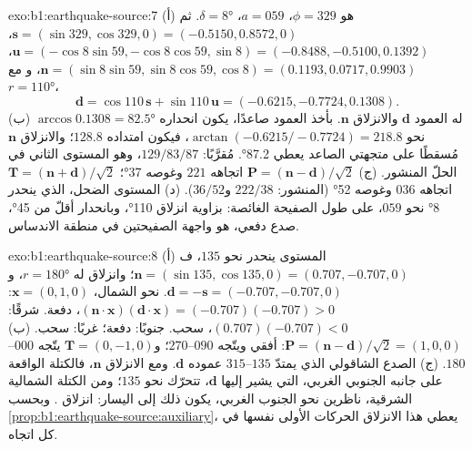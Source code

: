 \begin{solution}{exo:b1:earthquake-source:7}
(أ)  هو $\phi = 329$،  $a = 059$،  $\delta =
\ang{8}$. ثم $\mathbf s = (\sin329, \cos329, 0) = (-0.5150, 0.8572, 0)$،
$\mathbf u = (-\cos8\sin59, -\cos8\cos59, \sin8) = (-0.8488, -0.5100, 0.1392)$،
$\mathbf n = (\sin8\sin59, \sin8\cos59, \cos8) = (0.1193, 0.0717, 0.9903)$،
و مع $r = \ang{110}$،
\[
  \mathbf d = \cos110\,\mathbf s + \sin110\,\mathbf u = (-0.6215, -0.7724, 0.1308) .
\]
(ب)  له العمود $\mathbf d$ والانزلاق $\mathbf n$.
بأخذ العمود صاعدًا، يكون انحداره $\arccos 0.1308 = \ang{82.5}$ نحو
$\arctan(-0.6215/-0.7724) = 218.8$، فيكون امتداده $128.8$؛ والانزلاق
$\mathbf n$ مُسقطًا على متجهتي   الصاعد يعطي 
\ang{87.2}. مُقرَّبًا: $129/83/87$، وهو المستوى الثاني في الحلّ المنشور.
(ج) $\mathbf P = (\mathbf n - \mathbf d)/\sqrt2$ اتجاهه $221$ وغوصه
\ang{37}؛ $\mathbf T = (\mathbf n + \mathbf d)/\sqrt2$ اتجاهه $036$ وغوصه
\ang{52} (المنشور: $222/38$ و$36/52$). (د) المستوى الضحل، الذي ينحدر
\ang{8} نحو $059$، على طول الصفيحة الغائصة:  بزاوية انزلاق
\ang{110}، وبانحدار أقلّ من \ang{45}، صدع دفعي، هو واجهة الصفيحتين في منطقة الاندساس.
\end{solution}

\begin{solution}{exo:b1:earthquake-source:8}
(أ) المستوى ينحدر نحو $135$، ف$\mathbf n = (\sin135, \cos135, 0) =
(0.707, -0.707, 0)$؛ وانزلاق  له $r = \ang{180}$، و$\mathbf d = -\mathbf s
= (-0.707, -0.707, 0)$. نحو الشمال، $\mathbf x = (0, 1, 0)$:
$(\mathbf n\cdot\mathbf x)(\mathbf d\cdot\mathbf x) = (-0.707)(-0.707) > 0$، دفعة.
شرقًا: $(0.707)(-0.707) < 0$، سحب. جنوبًا: دفعة؛ غربًا: سحب.
(ب) $\mathbf P = (\mathbf n - \mathbf d)/\sqrt2 = (1, 0, 0)$:  أفقي
ويتّجه $090$--$270$؛ و$\mathbf T = (0, -1, 0)$ يتّجه
$000$--$180$. (ج) الصدع الشاقولي الذي يمتدّ $135$--$315$ عموده $\mathbf d$. ومع الانزلاق $\mathbf n$، فالكتلة الواقعة على جانبه الجنوبي الغربي، التي يشير إليها $\mathbf d$، تتحرّك نحو $135$؛ ومن الكتلة الشمالية الشرقية، ناظرين نحو الجنوب الغربي، يكون ذلك إلى اليسار: انزلاق . وبحسب
\cref{prop:b1:earthquake-source:auxiliary}، يعطي هذا الانزلاق الحركات الأولى نفسها في كل اتجاه.
\end{solution}

